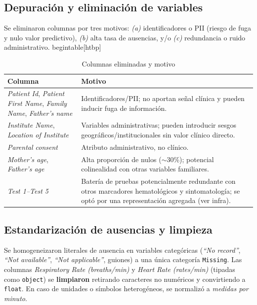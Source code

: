 \documentclass[11pt,a4paper,spanish]{book}
\numberwithin{equation}{chapter}
\numberwithin{figure}{chapter}
\begin{document}
\subsection*{Depuración y eliminación de variables}
Se eliminaron columnas por tres motivos: \textit{(a)} identificadores o PII (riesgo de fuga y nulo valor predictivo), \textit{(b)} alta tasa de ausencias, y/o \textit{(c)} redundancia o ruido administrativo.
begin{table}[htbp]
\begin{table}[htbp]
\centering
\caption{Columnas eliminadas y motivo}
\begin{tabularx}{\textwidth}{|l|X|}
\hline
\textbf{Columna} & \textbf{Motivo} \\
\hline
\textit{Patient Id}, \textit{Patient First Name}, \textit{Family Name}, \textit{Father's name} & Identificadores/PII; no aportan señal clínica y pueden inducir fuga de información. \\
\textit{Institute Name}, \textit{Location of Institute} & Variables administrativas; pueden introducir sesgos geográficos/institucionales sin valor clínico directo. \\
\textit{Parental consent} & Atributo administrativo, no clínico. \\
\textit{Mother's age}, \textit{Father's age} & Alta proporción de nulos ($\sim$30\%); potencial colinealidad con otras variables familiares. \\
\textit{Test 1--Test 5} & Batería de pruebas potencialmente redundante con otros marcadores hematológicos y sintomatología; se optó por una representación agregada (ver infra). \\
\hline
\end{tabularx}
\label{tab:drop_cols}
\end{table}

\subsection*{Estandarización de ausencias y limpieza}
Se homogeneizaron literales de ausencia en variables categóricas (\textit{``No record''}, \textit{``Not available''}, \textit{``Not applicable''}, guiones) a una única categoría \texttt{Missing}.  
Las columnas \textit{Respiratory Rate (breaths/min)} y \textit{Heart Rate (rates/min)} (tipadas como \texttt{object}) se \textbf{limpiaron} retirando caracteres no numéricos y convirtiendo a \texttt{float}. En caso de unidades o símbolos heterogéneos, se normalizó a \textit{medidas por minuto}.
\end{document}
